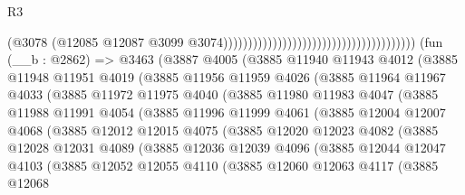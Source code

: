 \begin{lexlean}{R3}
\begin{coremodule}
                                                                              (@3078
                                                                                (@12085
                                                                                  @12087
                                                                                  @3099
                                                                                  @3074)))))))))))))))))))))))))))))))))))))))
    (fun (__b : @2862) =>
    @3463
      (@3887
        @4005
        (@3885
          @11940
          @11943
          @4012
          (@3885
            @11948
            @11951
            @4019
            (@3885
              @11956
              @11959
              @4026
              (@3885
                @11964
                @11967
                @4033
                (@3885
                  @11972
                  @11975
                  @4040
                  (@3885
                    @11980
                    @11983
                    @4047
                    (@3885
                      @11988
                      @11991
                      @4054
                      (@3885
                        @11996
                        @11999
                        @4061
                        (@3885
                          @12004
                          @12007
                          @4068
                          (@3885
                            @12012
                            @12015
                            @4075
                            (@3885
                              @12020
                              @12023
                              @4082
                              (@3885
                                @12028
                                @12031
                                @4089
                                (@3885
                                  @12036
                                  @12039
                                  @4096
                                  (@3885
                                    @12044
                                    @12047
                                    @4103
                                    (@3885
                                      @12052
                                      @12055
                                      @4110
                                      (@3885
                                        @12060
                                        @12063
                                        @4117
                                        (@3885
                                          @12068

\end{coremodule}
\end{lexlean}
